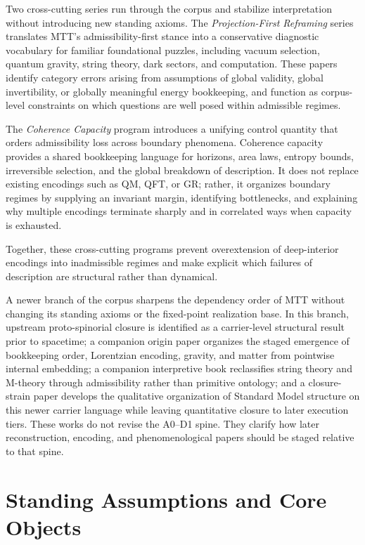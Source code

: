 \documentclass[11pt]{article}
\begin{document}
Two cross-cutting series run through the corpus and stabilize interpretation without introducing
new standing axioms. The \emph{Projection-First Reframing} series translates MTT’s admissibility-first
stance into a conservative diagnostic vocabulary for familiar foundational puzzles, including
vacuum selection, quantum gravity, string theory, dark sectors, and computation. These papers
identify category errors arising from assumptions of global validity, global invertibility, or
globally meaningful energy bookkeeping, and function as corpus-level constraints on which
questions are well posed within admissible regimes.

The \emph{Coherence Capacity} program introduces a unifying control quantity that orders
admissibility loss across boundary phenomena. Coherence capacity provides a shared bookkeeping
language for horizons, area laws, entropy bounds, irreversible selection, and the global breakdown
of description. It does not replace existing encodings such as QM, QFT, or GR; rather, it organizes
boundary regimes by supplying an invariant margin, identifying bottlenecks, and explaining why
multiple encodings terminate sharply and in correlated ways when capacity is exhausted.

Together, these cross-cutting programs prevent overextension of deep-interior encodings into
inadmissible regimes and make explicit which failures of description are structural rather than
dynamical.

A newer branch of the corpus sharpens the dependency order of MTT without changing its
standing axioms or the fixed-point realization base. In this branch, upstream proto-spinorial
closure is identified as a carrier-level structural result prior to spacetime; a companion origin
paper organizes the staged emergence of bookkeeping order, Lorentzian encoding, gravity, and
matter from pointwise internal embedding; a companion interpretive book reclassifies string
theory and M-theory through admissibility rather than primitive ontology; and a closure-strain
paper develops the qualitative organization of Standard Model structure on this newer carrier
language while leaving quantitative closure to later execution tiers. These works do not revise
the A0--D1 spine. They clarify how later reconstruction, encoding, and phenomenological papers
should be staged relative to that spine.



\section{Standing Assumptions and Core Objects}
\end{document}
